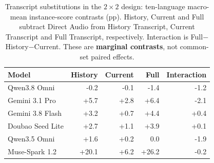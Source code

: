 \begin{table}[htbp]
\centering
\caption{Transcript substitutions in the $2\times2$ design: ten-language macro-mean instance-score contrasts (pp). History, Current and Full subtract Direct Audio from History Transcript, Current Transcript and Full Transcript, respectively. Interaction is Full$-$History$-$Current. These are \textbf{marginal contrasts}, not common-set paired effects.}
\label{tab:factorial_effects}
\begingroup
\fontsize{8.5}{10.5}\selectfont
\setlength{\tabcolsep}{1pt}
\renewcommand{\arraystretch}{1.06}
\begin{tabular*}{0.76\linewidth}{@{}l@{\extracolsep{\fill}}rrrr@{}}
\toprule
\textbf{Model} & \textbf{History} & \textbf{Current} & \textbf{Full} & \textbf{Interaction} \\
\midrule
Qwen3.8 Omni & -0.2 & -0.1 & -1.4 & -1.2 \\
Gemini 3.1 Pro & +5.7 & +2.8 & +6.4 & -2.1 \\
Gemini 3.8 Flash & +3.2 & +0.7 & +4.4 & +0.4 \\
Doubao Seed Lite & +2.7 & +1.1 & +3.9 & +0.1 \\
Qwen3.5 Omni & +1.6 & +0.2 & 0.0 & -1.9 \\
Muse-Spark 1.2 & +20.1 & +6.2 & +26.2 & -0.2 \\
\bottomrule
\end{tabular*}
\endgroup
\end{table}

